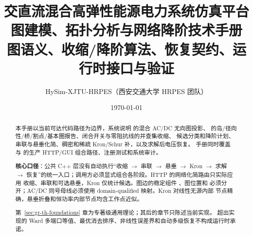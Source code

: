 \documentclass[UTF8,fontset=fandol,a4paper,11pt]{ctexart}
\title{\textbf{交直流混合高弹性能源电力系统仿真平台}\\[0.5em]
       {\Large 图建模、拓扑分析与网络降阶技术手册}\\[0.3em]
       {\large 图语义、收缩/降阶算法、恢复契约、运行时接口与验证}}
\author{HySim-XJTU-HRPES（西安交通大学 HRPES 团队）}
\date{\today}
\begin{document}
\maketitle
\begin{abstract}
\noindent 本手册以当前可达代码路径为边界，系统说明
 的混合 AC/DC 无向图投影、
 的岛/径向性/桥/割点/基本圈报告、闭合开关与零阻抗线的并查集收缩、
候选分类和降阶计划、串联与悬垂化简、稠密和稀疏 Kron/Schur 补，以及求解后电压恢复。
手册同时覆盖  与
 的生产 HTTP/GUI 组合路径、注册测试和系统审计。

\smallskip
\noindent\textbf{核心口径}：公共 C++ 层没有自动执行“收缩 $\to$ 串联 $\to$ 悬垂 $\to$ Kron
$\to$ 求解 $\to$ 恢复”的统一入口；调用方必须显式组合各阶段。HTTP 的网络化简路由只实际应用
收缩、串联和可选悬垂，Kron 仅统计候选。图边的稳定组件 、图位置和
 必须分开；AC/DC 同号母线必须使用 domain-qualified 映射。Kron 对线性无源内部
节点精确，悬垂折叠和恒功率内部节点均含工作点近似。

\smallskip
\noindent 第~\ref{sec:gr-th-foundations} 章为专著级通用理论；其后的章节只陈述当前实现。
超出实现的 Ward 多端口等值、最优消去排序、非线性误差界和自动多级恢复不构成运行时承诺。
\end{abstract}

\tableofcontents
\newpage














\end{document}
